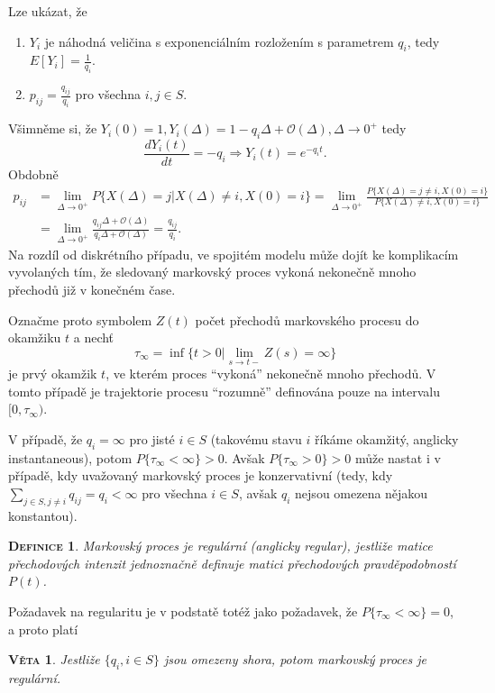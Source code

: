 \documentclass[10pt]{article}
\newtheorem{mydef}{\textsc{Definice}}
\newtheorem{proposition}{\textsc{Věta}}
\begin{document}
Lze ukázat, že
\begin{enumerate}
\item $Y_i$ je náhodná veličina s exponenciálním rozložením s parametrem $q_i$, tedy $E[Y_i]= \frac{1}{q_i}$.
\item $p_{ij} = \frac{q_{ij}}{q_i}$ pro všechna $i,j \in S$.
\end{enumerate}

Všimněme si, že $Y_i(0) = 1, Y_i(\Delta)=1-q_i \Delta + \mathcal{O}(\Delta), \Delta \to 0^+$ tedy $$\frac{dY_i(t)}{dt}=-q_i \Rightarrow Y_i(t)=e^{-q_i t}.$$ Obdobně
\begin{equation}
\begin{split}
p_{ij}  &=\lim_{\Delta \to 0^+} P\{X(\Delta)=j|X(\Delta) \neq i,X(0) = i\} = \lim_{\Delta \to 0^+} \frac{ P\{X(\Delta)=j \neq i,X(0) = i\} }{ P\{X(\Delta) \neq i,X(0) = i\} }\\
        &=\lim_{\Delta \to 0^+} \frac{q_{ij} \Delta + \mathcal{O}(\Delta)}{q_i \Delta + \mathcal{O}(\Delta)}=\frac{q_{ij}}{q_i}.
\end{split}
\end{equation}
Na rozdíl od diskrétního případu, ve spojitém modelu může dojít ke komplikacím vyvolaných tím, že sledovaný markovský proces vykoná nekonečně mnoho přechodů již v konečném čase.

Označme proto symbolem $Z(t)$ počet přechodů markovského procesu do okamžiku $t$ a nechť $$\tau_\infty=\inf \{t>0|\lim_{s \to t-} Z(s) = \infty\}$$ je prvý okamžik $t$, ve kterém proces ``vykoná'' nekonečně mnoho přechodů. V tomto případě je trajektorie procesu ``rozumně'' definována pouze na intervalu $[0, \tau_\infty)$.

V případě, že $q_i= \infty$ pro jisté $i \in S$ (takovému stavu $i$ říkáme okamžitý, anglicky instantaneous), potom $P\{\tau_\infty<\infty\}>0$. Avšak $P\{\tau_\infty >0\}>0$ může nastat i v případě, kdy uvažovaný markovský proces je konzervativní (tedy, kdy $\sum_{j \in S, j \neq i} q_{ij} = q_i < \infty$ pro všechna $i \in S$, avšak $q_i$ nejsou omezena nějakou konstantou).

\begin{mydef}
Markovský proces je regulární (anglicky regular), jestliže matice přechodových intenzit jednoznačně definuje matici přechodových pravděpodobností $P(t)$.
\end{mydef}

Požadavek na regularitu je v podstatě totéž jako požadavek, že $P\{\tau_\infty<\infty\}=0$, a proto platí
\begin{proposition}
Jestliže $\{q_i, i \in S\}$ jsou omezeny shora, potom markovský proces je regulární.
\end{proposition}
\end{document}
